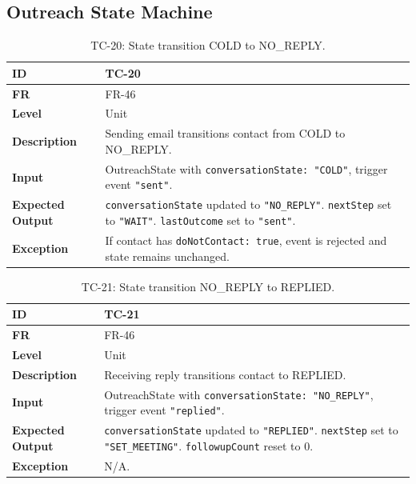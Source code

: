 \documentclass[a4paper]{article}
\begin{document}
\subsection{Outreach State Machine}

\begin{table}[H]
\centering
\caption{TC-20: State transition COLD to NO\_REPLY.}
\small
\begin{tabular}{|p{3cm}|p{10.5cm}|}
\hline
\textbf{ID} & TC-20 \\
\hline
\textbf{FR} & FR-46 \\
\hline
\textbf{Level} & Unit \\
\hline
\textbf{Description} & Sending email transitions contact
from COLD to NO\_REPLY. \\
\hline
\textbf{Input} & OutreachState with \texttt{conversationState:
"COLD"}, trigger event \texttt{"sent"}. \\
\hline
\textbf{Expected Output} & \texttt{conversationState} updated
to \texttt{"NO\_REPLY"}. \texttt{nextStep} set to
\texttt{"WAIT"}. \texttt{lastOutcome} set to
\texttt{"sent"}. \\
\hline
\textbf{Exception} & If contact has \texttt{doNotContact:
true}, event is rejected and state remains unchanged. \\
\hline
\end{tabular}
\end{table}

\begin{table}[H]
\centering
\caption{TC-21: State transition NO\_REPLY to REPLIED.}
\begin{tabular}{|p{3cm}|p{10.5cm}|}
\hline
\textbf{ID} & TC-21 \\
\hline
\textbf{FR} & FR-46 \\
\hline
\textbf{Level} & Unit \\
\hline
\textbf{Description} & Receiving reply transitions contact to REPLIED. \\
\hline
\textbf{Input} & OutreachState with \texttt{conversationState: "NO\_REPLY"}, trigger event \texttt{"replied"}. \\
\hline
\textbf{Expected Output} & \texttt{conversationState} updated to \texttt{"REPLIED"}. \texttt{nextStep} set to \texttt{"SET\_MEETING"}. \texttt{followupCount} reset to 0. \\
\hline
\textbf{Exception} & N/A. \\
\hline
\end{tabular}
\small
\end{table}
\end{document}
